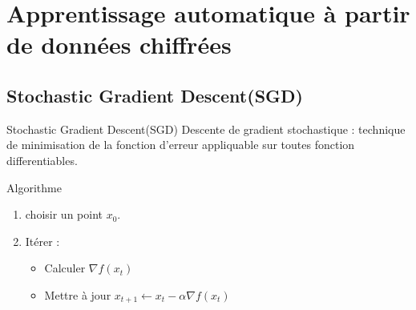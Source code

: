 \documentclass{beamer}
\begin{document}
\section{Apprentissage automatique à partir de données chiffrées}
\subsection{Stochastic Gradient Descent(SGD)}
  \begin{frame}{Stochastic Gradient Descent(SGD)}
Descente de gradient stochastique : technique de minimisation de la fonction d'erreur {\tiny appliquable sur toutes fonction differentiables}.\newline

\begin{block}{Algorithme}
\begin{enumerate}
	\item{choisir un point $x_0$.}
	\item{Itérer : 
\begin{itemize}
	\item{Calculer $\nabla f(x_t)$ }
	\item{Mettre à jour $x_{t+1}\leftarrow x_t - \alpha \nabla f(x_t)$}
\end{itemize}
	}
\end{enumerate}
\end{block}
\end{frame}
\end{document}
